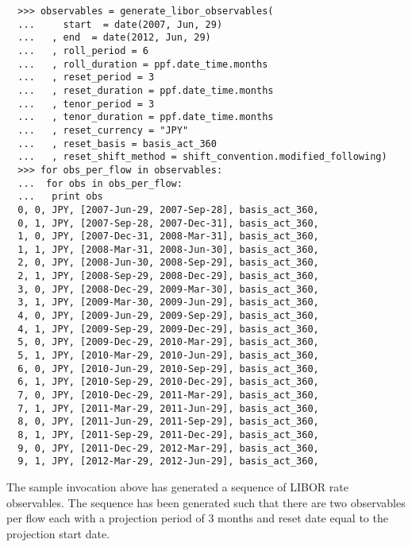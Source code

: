\begin{verbatim}
  >>> observables = generate_libor_observables(
  ...     start  = date(2007, Jun, 29)
  ...   , end  = date(2012, Jun, 29)
  ...   , roll_period = 6
  ...   , roll_duration = ppf.date_time.months
  ...   , reset_period = 3
  ...   , reset_duration = ppf.date_time.months
  ...   , tenor_period = 3
  ...   , tenor_duration = ppf.date_time.months
  ...   , reset_currency = "JPY"
  ...   , reset_basis = basis_act_360
  ...   , reset_shift_method = shift_convention.modified_following)
  >>> for obs_per_flow in observables:
  ...  for obs in obs_per_flow:
  ...   print obs
  0, 0, JPY, [2007-Jun-29, 2007-Sep-28], basis_act_360, 
  0, 1, JPY, [2007-Sep-28, 2007-Dec-31], basis_act_360, 
  1, 0, JPY, [2007-Dec-31, 2008-Mar-31], basis_act_360, 
  1, 1, JPY, [2008-Mar-31, 2008-Jun-30], basis_act_360, 
  2, 0, JPY, [2008-Jun-30, 2008-Sep-29], basis_act_360, 
  2, 1, JPY, [2008-Sep-29, 2008-Dec-29], basis_act_360, 
  3, 0, JPY, [2008-Dec-29, 2009-Mar-30], basis_act_360, 
  3, 1, JPY, [2009-Mar-30, 2009-Jun-29], basis_act_360, 
  4, 0, JPY, [2009-Jun-29, 2009-Sep-29], basis_act_360, 
  4, 1, JPY, [2009-Sep-29, 2009-Dec-29], basis_act_360, 
  5, 0, JPY, [2009-Dec-29, 2010-Mar-29], basis_act_360, 
  5, 1, JPY, [2010-Mar-29, 2010-Jun-29], basis_act_360, 
  6, 0, JPY, [2010-Jun-29, 2010-Sep-29], basis_act_360, 
  6, 1, JPY, [2010-Sep-29, 2010-Dec-29], basis_act_360, 
  7, 0, JPY, [2010-Dec-29, 2011-Mar-29], basis_act_360, 
  7, 1, JPY, [2011-Mar-29, 2011-Jun-29], basis_act_360, 
  8, 0, JPY, [2011-Jun-29, 2011-Sep-29], basis_act_360, 
  8, 1, JPY, [2011-Sep-29, 2011-Dec-29], basis_act_360, 
  9, 0, JPY, [2011-Dec-29, 2012-Mar-29], basis_act_360, 
  9, 1, JPY, [2012-Mar-29, 2012-Jun-29], basis_act_360, 
\end{verbatim}
The sample invocation above has generated a sequence of LIBOR rate
observables. The sequence has been generated such that there are two
observables per flow each with a projection period of 3 months and
reset date equal to the projection start date.

